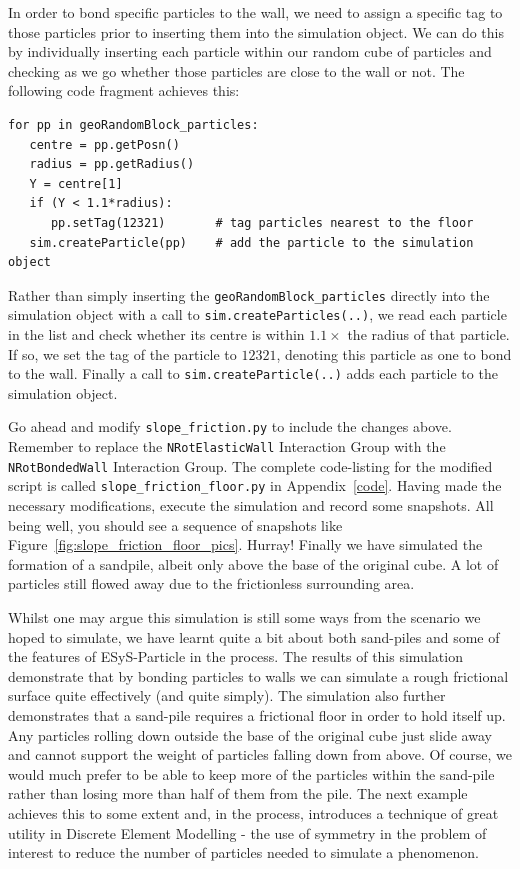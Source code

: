 In order to bond specific particles to the wall, we need to assign a specific tag to those particles prior to inserting them into the simulation object. We can do this by individually inserting each particle within our random cube of particles and checking as we go whether those particles are close to the wall or not. The following code fragment achieves this:

\begin{verbatim}
for pp in geoRandomBlock_particles:
   centre = pp.getPosn()
   radius = pp.getRadius()
   Y = centre[1]
   if (Y < 1.1*radius):
      pp.setTag(12321)       # tag particles nearest to the floor
   sim.createParticle(pp)    # add the particle to the simulation object
\end{verbatim}

\noindent
Rather than simply inserting the \texttt{geoRandomBlock\_particles} directly into the simulation object with a call to \texttt{sim.createParticles(..)}, we read each particle in the list and check whether its centre is within $1.1 \times$ the radius of that particle. If so, we set the tag of the particle to $12321$, denoting this particle as one to bond to the wall. Finally a call to \texttt{sim.createParticle(..)} adds each particle to the simulation object.

Go ahead and modify \texttt{slope\_friction.py} to include the changes above. Remember to replace the \texttt{NRotElasticWall} Interaction Group with the \texttt{NRotBondedWall} Interaction Group. The complete code-listing for the modified script is called \texttt{slope\_\+fric\+tion\_\+floor.py} in Appendix~\ref{code}. Having made the necessary modifications, execute the simulation and record some snapshots. All being well, you should see a sequence of snapshots like Figure~\ref{fig:slope_friction_floor_pics}. Hurray! Finally we have simulated the formation of a sandpile, albeit only above the base of the original cube. A lot of particles still flowed away due to the frictionless surrounding area. 

Whilst one may argue this simulation is still some ways from the scenario we hoped to simulate, we have learnt quite a bit about both sand-piles and some of the features of ESyS-Particle in the process. The results of this simulation demonstrate that by bonding particles to walls we can simulate a rough frictional surface quite effectively (and quite simply). The simulation also further demonstrates that a sand-pile requires a frictional floor in order to hold itself up. Any particles rolling down outside the base of the original cube just slide away and cannot support the weight of particles falling down from above. Of course, we would much prefer to be able to keep more of the particles within the sand-pile rather than losing more than half of them from the pile. The next example achieves this to some extent and, in the process, introduces a technique of great utility in Discrete Element Modelling - the use of symmetry in the problem of interest to reduce the number of particles needed to simulate a 
phenomenon. 

